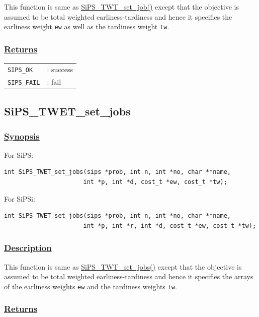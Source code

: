 \documentclass[a4paper]{book}
\begin{document}
This function is same as \hyperlink{SiPS_TWT_set_job}{SiPS\_TWT\_set\_job()} except that the objective is assumed to be total weighted earliness-tardiness and hence it specifies the earliness weight \verb+ew+ as well as the tardiness weight \verb+tw+.

\subsubsection{\underline{Returns}}

\begin{tabular}{ll}
  \verb+SIPS_OK+  &: success\\
  \verb+SIPS_FAIL+&: fail\\
\end{tabular}

\hypertarget{SiPS_TWET_set_jobs}{%
\subsection{SiPS\_TWET\_set\_jobs}
}

\subsubsection{\underline{Synopsis}}

For SiPS:

\begin{verbatim}
int SiPS_TWET_set_jobs(sips *prob, int n, int *no, char **name,
                      int *p, int *d, cost_t *ew, cost_t *tw);
\end{verbatim}

\noindent
For SiPSi:

\begin{verbatim}
int SiPS_TWET_set_jobs(sips *prob, int n, int *no, char **name,
                      int *p, int *r, int *d, cost_t *ew, cost_t *tw);
\end{verbatim}

\subsubsection{\underline{Description}}

This function is same as \hyperlink{SiPS_TWT_set_jobs}{SiPS\_TWT\_set\_jobs()} except that the objective is assumed to be total weighted earliness-tardiness and hence it specifies the arrays of the earliness weights \verb+ew+ and the tardiness weights \verb+tw+.

\subsubsection{\underline{Returns}}
\end{document}
